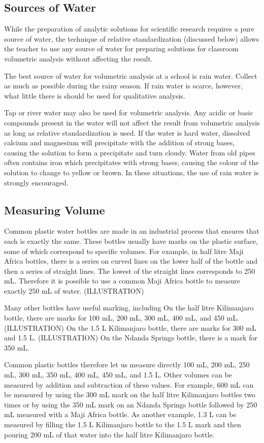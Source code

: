 \subsection{Sources of Water}
While the preparation of analytic solutions for scientific research requires a pure source of water, the technique of relative standardization (discussed below) allows the teacher to use any source of water for preparing solutions for classroom volumetric analysis without affecting the result.

The best source of water for volumetric analysis at a school is rain water. Collect as much as possible during the rainy season. If rain water is scarce, however, what little there is should be used for qualitative analysis.

Tap or river water may also be used for volumetric analysis. Any acidic or basic compounds present in the water will not affect the result from volumetric analysis as long as relative standardization is used. If the water is hard water, dissolved calcium and magnesium will precipitate with the addition of strong bases, causing the solution to form a precipitate and turn cloudy. Water from old pipes often contains iron which precipitates with strong bases, causing the colour of the solution to change to yellow or brown. In these situations, the use of rain water is strongly encouraged.

\subsection{Measuring Volume}
Common plastic water bottles are made in an industrial process that ensures that each is exactly the same. These bottles usually have marks on the plastic surface, some of which correspond to specific volumes. For example, in half litre Maji Africa bottles, there is a series on curved lines on the lower half of the bottle and then a series of straight lines. The lowest of the straight lines corresponds to 250 mL. Therefore it is possible to use a common Maji Africa bottle to measure exactly 250 mL of water. (ILLUSTRATION)

Many other bottles have useful marking, including 
On the half litre Kilimanjaro bottle, there are marks for 100 mL, 200 mL, 300 mL, 400 mL, and 450 mL. (ILLUSTRATION)
On the 1.5 L Kilimanjaro bottle, there are marks for 300 mL and 1.5 L. (ILLUSTRATION)
On the Ndanda Springs bottle, there is a mark for 350 mL.

Common plastic bottles therefore let us measure directly 100 mL, 200 mL, 250 mL, 300 mL, 350 mL, 400 mL, 450 mL, and 1.5 L. Other volumes can be measured by addition and subtraction of these values. For example, 600 mL can be measured by using the 300 mL mark on the half litre Kilimanjaro bottles two times or by using the 350 mL mark on an Ndanda Springs bottle followed by 250 mL measured with a Maji Africa bottle. As another example, 1.3 L can be measured by filling the 1.5 L Kilimanjaro bottle to the 1.5 L mark and then pouring 200 mL of that water into the half litre Kilimanjaro bottle.

